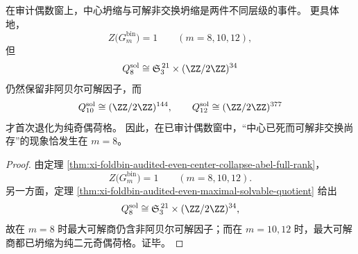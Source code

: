 \begin{corollary}[中心坍缩与可解非交换坍缩不同步]\label{cor:xi-foldbin-center-solvable-collapse-two-stage}
在审计偶数窗上，中心坍缩与可解非交换坍缩是两件不同层级的事件。
更具体地，
\[
Z\!\bigl(G_m^{\mathrm{bin}}\bigr)=1
\qquad (m=8,10,12),
\]
但
\[
Q_8^{\mathrm{sol}}
\cong
\mathfrak S_3^{\,21}\times (\ZZ/2\ZZ)^{34}
\]
仍然保留非阿贝尔可解因子，而
\[
Q_{10}^{\mathrm{sol}}
\cong
(\ZZ/2\ZZ)^{144},
\qquad
Q_{12}^{\mathrm{sol}}
\cong
(\ZZ/2\ZZ)^{377}
\]
才首次退化为纯奇偶荷格。
因此，在已审计偶数窗中，“中心已死而可解非交换尚存”的现象恰发生在 \(m=8\)。
\end{corollary}
\begin{proof}
由定理 \ref{thm:xi-foldbin-audited-even-center-collapse-abel-full-rank}，
\[
Z\!\bigl(G_m^{\mathrm{bin}}\bigr)=1
\qquad (m=8,10,12).
\]
另一方面，定理 \ref{thm:xi-foldbin-audited-even-maximal-solvable-quotient} 给出
\[
Q_8^{\mathrm{sol}}
\cong
\mathfrak S_3^{\,21}\times (\ZZ/2\ZZ)^{34},
\]
故在 \(m=8\) 时最大可解商仍含非阿贝尔可解因子；而在
\(
m=10,12
\)
时，最大可解商都已坍缩为纯二元奇偶荷格。证毕。
\end{proof}

